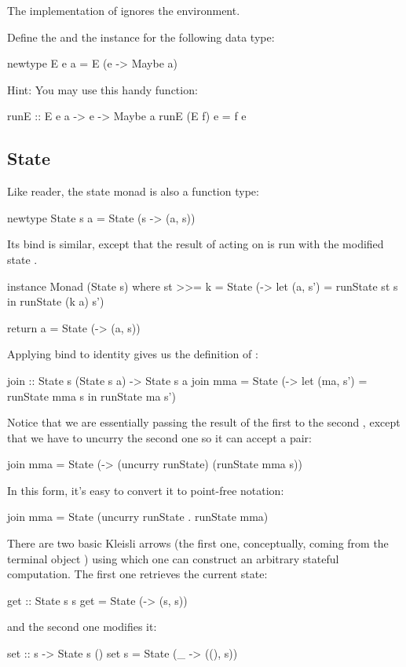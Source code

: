 \documentclass[DaoFP]{subfiles}
\begin{document}
The implementation of  ignores the environment.

\begin{exercise}
Define the  and the  instance for the following data type:
\begin{haskell}
newtype E e a = E (e -> Maybe a)
\end{haskell}
Hint: You may use this handy function:
\begin{haskell}
runE :: E e a -> e -> Maybe a
runE (E f) e = f e
\end{haskell}
\end{exercise}


\subsection{State}
Like reader, the state monad is also a function type:
\begin{haskell}
newtype State s a = State (s -> (a, s))
\end{haskell}
Its bind is similar, except that the result of  acting on   is run with the modified state .
\begin{haskell}
instance Monad (State s) where
  st >>= k = State (\s -> let (a, s') = runState st s
                          in runState (k a) s')
                          
  return a = State (\s -> (a, s))
\end{haskell}

Applying bind to identity gives us the definition of :
\begin{haskell}
join :: State s (State s a) -> State s a
join mma = State (\s -> let (ma, s') = runState mma s
                        in runState ma s')
\end{haskell}
Notice that we are essentially passing the result of the first  to the second , except that we have to uncurry the second one so it can accept a pair:
                             
\begin{haskell}
join mma = State (\s -> (uncurry runState) (runState mma s))
\end{haskell}
In this form, it's easy to convert it to point-free notation:
\begin{haskell}
join mma = State (uncurry runState . runState mma)
\end{haskell}

There are two basic Kleisli arrows (the first one, conceptually, coming from the terminal object \hask{()}) using which one can construct an arbitrary stateful computation. The first one retrieves the current state:
\begin{haskell}
get :: State s s
get = State (\s -> (s, s))
\end{haskell}
and the second one modifies it:
\begin{haskell}
set :: s -> State s ()
set s = State (\_ -> ((), s))
\end{haskell}
\end{document}
